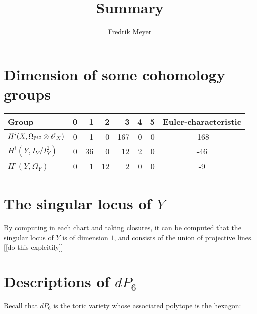 \documentclass[11pt, english]{article}
\begin{document}
\title{Summary}
\author{Fredrik Meyer}
\maketitle 

\section{Dimension of some cohomology groups}

\begin{tabular}{ l || c | r | r | r | r | r | c  }
 Group & 0 & 1 & 2 & 3 & 4 & 5 & Euler-characteristic \\
\hline
$H^i(X, \Omega_{\mathbb{P}^{12}} \otimes \operatorname{\mathscr{O}}_X)$ & 0 & 1 & 0 & 167 & 0 & 0 & -168\\
$H^i(Y, I_Y/I_Y^2)$ & 0 & 36 & 0 & 12 & 2 & 0 & -46 \\
$H^i(Y, \Omega_Y)$ & 0 & 1  & 12 & 2 & 0  & 0 & -9
\end{tabular}


\section{The singular locus of $Y$}

By computing in each chart and taking closures, it can be computed that the singular locus of $Y$ is of dimension $1$, and consists of the union of 
projective lines. [[do this explcitily]]

\section{Descriptions of $dP_6$}

Recall that $dP_6$ is the toric variety whose associated polytope is the hexagon:
 
\begin{center}
\end{center}
\end{document}
